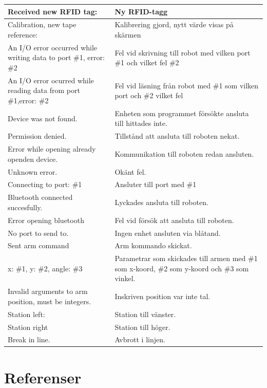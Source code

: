 \documentclass[a4paper,12pt]{article}
\begin{document}
\begin{longtable}{|p{}|p{}|}
        Received new RFID tag:  &  Ny RFID-tagg \\ \hline
        Calibration, new tape reference:  & Kalibrering gjord, nytt värde visas på skärmen \\ \hline
        An I/O error occurred while writing data to port \#1, error: \#2 & Fel vid skrivning till robot med vilken port \#1 och vilket fel \#2\\ \hline
        An I/O error ocurred while reading data from port \#1,error: \#2 & Fel vid läsning från robot med \#1 som vilken port och \#2 vilket fel\\ \hline
        Device was not found. & Enheten som programmet försökte ansluta till hittades inte. \\ \hline
        Permission denied. & Tillstånd att ansluta till roboten nekat. \\ \hline
        Error while opening already openden device. & Kommunikation till roboten redan ansluten. \\ \hline
        Unknown error. & Okänt fel.\\ \hline
        Connecting to port: \#1 & Ansluter till port med \#1  \\ \hline
        Bluetooth connected succesfully. & Lyckades ansluta till roboten. \\ \hline
        Error opening bluetooth & Fel vid försök att ansluta till roboten.\\ \hline
        No port to send to. & Ingen enhet ansluten via blåtand. \\ \hline
        Sent arm command & Arm kommando skickat. \\ \hline
        x: \#1, y: \#2, angle: \#3 & Parametrar som skickades till armen med \#1 som x-koord, \#2 som y-koord och \#3 som vinkel. \\ \hline
        Invalid arguments to arm position, must be integers. & Inskriven position var inte tal. \\ \hline
        Station left:  & Station till vänster. \\ \hline
        Station right & Station till höger. \\ \hline
        Break in line. & Avbrott i linjen.
\label{tab:logg}
\end{longtable}


\newpage
\section*{Referenser}


\newpage
\appendix
\end{document}
